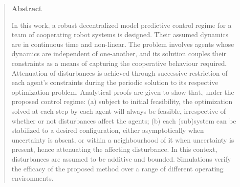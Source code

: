 

\begin{quotation}

\begin{center}
\textbf{Abstract}
\end{center}

In this work, a robust decentralized model predictive control regime for a team
of cooperating robot systems is designed. Their assumed dynamics are
in continuous time and non-linear. The problem involves agents whose dynamics
are independent of one-another, and its solution couples their constraints as a
means of capturing the cooperative behaviour required. Attenuation of
disturbances is achieved through successive restriction of each agent's
constraints during the periodic solution to its respective optimization problem.
Analytical proofs are given to show that, under the proposed control regime:
(a) subject to initial feasibility, the optimization solved at each step
by each agent will always be feasible, irrespective of whether or not
disturbances affect the agents;
(b) each (sub)system can be stabilized to a desired configuration, either
asymptotically when uncertainty is absent, or within a neighbourhood of it when
uncertainty is present, hence attenuating the affecting disturbance.
In this context, disturbances are assumed to be additive and bounded.
Simulations verify the efficacy of the proposed method over a range of different
operating environments.

\end{quotation}

\restoregeometry
